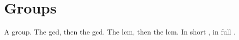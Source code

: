 \documentclass{article}
\begin{document}
\section{Groups}
A \gls{group}. The \gls{gcd}, then the \gls{gcd}. The \gls{lcm}, then the
\gls{lcm}. In short , in full .
\printglossaries
\end{document}
